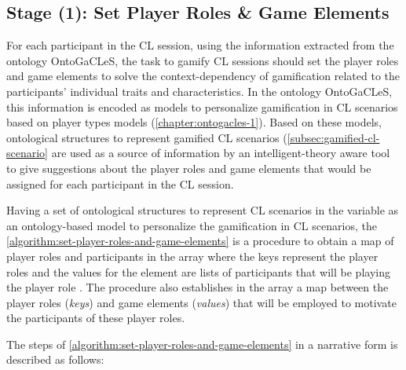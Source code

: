 \subsection{Stage (1): Set Player Roles \& Game Elements}

For each participant in the CL session, using the information extracted from the ontology OntoGaCLeS, the task to gamify CL sessions should set the player roles and game elements to solve the context-dependency of gamification related to the participants' individual traits and characteristics.
In the ontology OntoGaCLeS, this information is encoded as models to personalize gamification in CL scenarios based on player types models (\autoref{chapter:ontogacles-1}).
Based on these models, ontological structures to represent gamified CL scenarios (\autoref{subsec:gamified-cl-scenario} are used as a source of information by an intelligent-theory aware tool to give suggestions about the player roles and game elements that would be assigned for each participant in the CL session.

Having a set of ontological structures to represent CL scenarios in the variable  as an ontology-based model to personalize the gamification in CL scenarios, the \autoref{algorithm:set-player-roles-and-game-elements} is a procedure to obtain a map of player roles and participants in the array  where the keys represent the player roles and the values for the element  are lists of participants that will be playing the player role .
The procedure also establishes in the array  a map between the player roles (\emph{keys}) and game elements (\emph{values}) that will be employed to motivate the participants of these player roles.

The steps of \autoref{algorithm:set-player-roles-and-game-elements} in a narrative form is described as follows:

